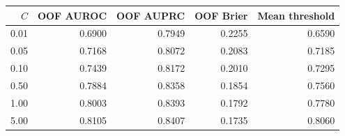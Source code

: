 \begin{tabular}{rrrrr}
\toprule
$C$ & OOF AUROC & OOF AUPRC & OOF Brier & Mean threshold \\
\midrule
0.01 & 0.6900 & 0.7949 & 0.2255 & 0.6590 \\
0.05 & 0.7168 & 0.8072 & 0.2083 & 0.7185 \\
0.10 & 0.7439 & 0.8172 & 0.2010 & 0.7295 \\
0.50 & 0.7884 & 0.8358 & 0.1854 & 0.7560 \\
1.00 & 0.8003 & 0.8393 & 0.1792 & 0.7780 \\
5.00 & 0.8105 & 0.8407 & 0.1735 & 0.8060 \\
\bottomrule
\end{tabular}
